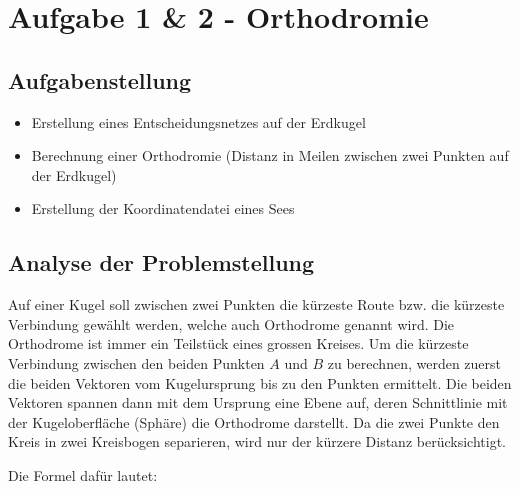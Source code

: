 \newcommand\DrawLatitudeCirclered[2][1]{
  \LatitudePlane{\angEl}{#2}
  \tikzset{current plane/.prefix style={scale=#1}}
  \pgfmathsetmacro\sinVis{sin(#2)/cos(#2)*sin(\angEl)/cos(\angEl)}
  \pgfmathsetmacro\angVis{asin(min(1,max(\sinVis,-1)))}
\draw[current plane,red,thick] (-50:1) arc (-50:-35:1);
}




\section{Aufgabe 1 \& 2 - Orthodromie}
\subsection{Aufgabenstellung}
\begin{itemize}
  \item Erstellung eines Entscheidungsnetzes auf der Erdkugel
  \item Berechnung einer Orthodromie (Distanz in Meilen zwischen zwei Punkten auf der Erdkugel)
  \item Erstellung der Koordinatendatei eines Sees
\end{itemize}

\subsection{Analyse der Problemstellung}
Auf einer Kugel soll zwischen zwei Punkten die kürzeste Route bzw. die kürzeste Verbindung gewählt werden, welche auch Orthodrome genannt wird. Die Orthodrome ist immer ein Teilstück eines grossen Kreises. Um die kürzeste Verbindung zwischen den beiden Punkten $A$ und $B$ zu berechnen, werden zuerst die beiden Vektoren vom Kugelursprung bis zu den Punkten ermittelt. Die beiden Vektoren spannen dann mit dem Ursprung eine Ebene auf, deren Schnittlinie mit der Kugeloberfläche (Sphäre) die Orthodrome darstellt. Da die zwei Punkte den Kreis in zwei Kreisbogen separieren, wird nur der kürzere Distanz berücksichtigt.

Die Formel dafür lautet:




